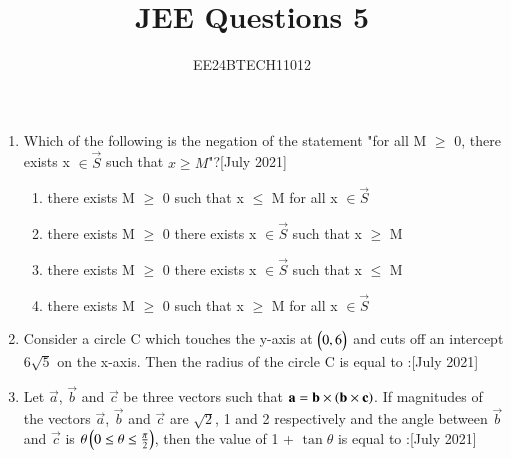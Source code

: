 \documentclass[journal,12pt,onecolumn]{IEEEtran}
\theoremstyle{remark}
\begin{document}

\vspace{3cm}

\title{JEE Questions 5}
\author{EE24BTECH11012}
\maketitle
\newpage
\bigskip

\renewcommand{\thefigure}{\theenumi}
\renewcommand{\thetable}{\theenumi}
\begin{enumerate}
	\item Which of the following is the negation of the statement "for all M $\geq$ 0, there exists x $\in \vec{S}$ such that $x\geq M$"?\hfill{[July 2021]}
		\begin{enumerate}
			\item there exists M $\geq$ 0 such that x $\leq$ M for all x $\in \vec{S}$
			\item there exists M $\geq$ 0 there exists x $\in \vec{S}$ such that x $\geq$ M
			\item there exists M $\geq$ 0 there exists x $\in \vec{S}$ such that x $\leq$ M
			\item there exists M $\geq$ 0 such that x $\geq$ M for all x $\in \vec{S}$
		\end{enumerate}
	\item Consider a circle C which touches the y-axis at $\begin{pmatrix}0,6\end{pmatrix}$ and cuts off an intercept $6\sqrt{5}$ on the x-axis. Then the radius of the circle C is equal to :\hfill{[July 2021]}
		\begin{enumerate}
		\end{enumerate}
	\item Let $\vec{a}$, $\vec{b}$ and $\vec{c}$ be three vectors such that $\mathbf{a} = \mathbf{b} \times \left(\mathbf{b} \times \mathbf{c}\right)$. If magnitudes of the vectors $\vec{a}$, $\vec{b}$ and $\vec{c}$ are $\sqrt{2}$, 1 and 2 respectively and the angle between $\vec{b}$ and $\vec{c}$ is $\theta \left(0 \leq \theta \leq \frac{\pi}{2}\right)$, then the value of 1 + $\tan{\theta}$ is equal to :\hfill{[July 2021]}
		\begin{enumerate}
				\begin{multicols}{4}
				\item $\sqrt{3}$ + 1

\end{multicols}
\end{enumerate}
\end{enumerate}
\end{document}
